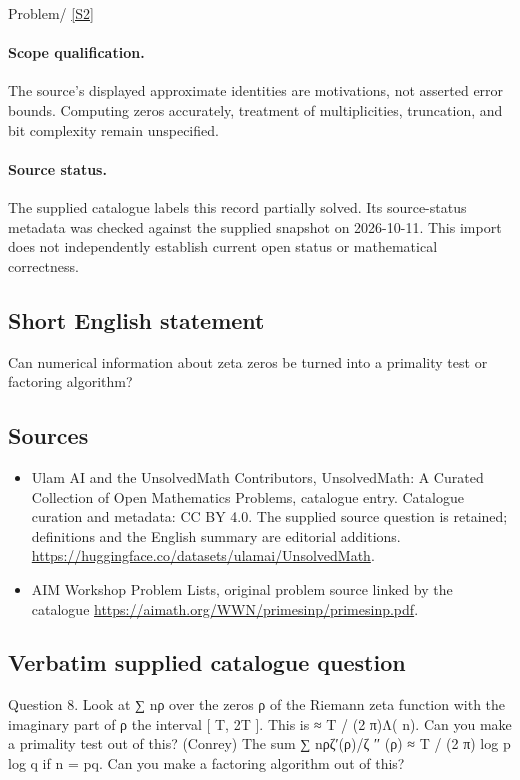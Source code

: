 \documentclass[11pt]{article}
\begin{document}
Problem/ \href{https://aimath.org/WWN/primesinp/primesinp.pdf}{[S2]}
\paragraph{Scope qualification.}
The source's displayed approximate identities are motivations, not asserted error bounds. Computing zeros accurately, treatment of multiplicities, truncation, and bit complexity remain unspecified.
\paragraph{Source status.}
The supplied catalogue labels this record partially solved. Its source-status metadata was checked against the supplied snapshot on 2026-10-11. This import does not independently establish current open status or mathematical correctness.
\subsection{Short English statement}
Can numerical information about zeta zeros be turned into a primality test or factoring algorithm?
\subsection{Sources}
\begin{itemize}
\item[S1] Ulam AI and the UnsolvedMath Contributors, UnsolvedMath: A Curated Collection of Open Mathematics Problems, catalogue entry. Catalogue curation and metadata: CC BY 4.0. The supplied source question is retained; definitions and the English summary are editorial additions.
\url{https://huggingface.co/datasets/ulamai/UnsolvedMath}.
\item[S2] AIM Workshop Problem Lists, original problem source linked by the catalogue
\url{https://aimath.org/WWN/primesinp/primesinp.pdf}.
\end{itemize}
\subsection{Verbatim supplied catalogue question}
Question 8. Look at ∑ nρ over the zeros ρ of the Riemann zeta function with the imaginary part of ρ the interval [ T, 2T ]. This is ≈ T / (2 π)Λ( n). Can you make a primality test out of this? (Conrey) The sum ∑ nρζ′(ρ)/ζ ′′ (ρ) ≈ T / (2 π) log p log q if n = pq. Can you make a factoring algorithm out of this?
\end{document}
